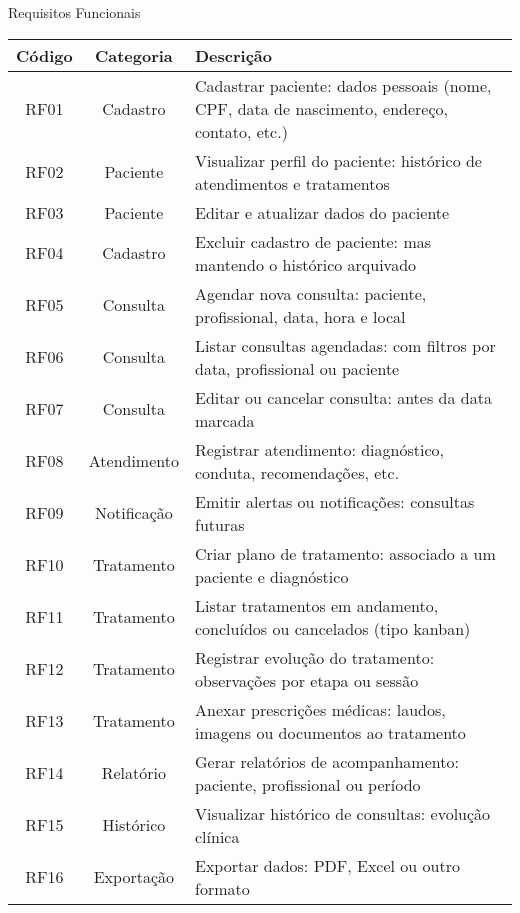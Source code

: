 \begin{quadro}
    \caption{\label{quadro_requisitos_f}Requisitos Funcionais}
    \begin{tabular}{|c|c|p{10cm}|}
        \hline
        \textbf{Código} & \textbf{Categoria} & \textbf{Descrição} \\ \hline
        RF01   & Cadastro     & Cadastrar paciente: dados pessoais (nome, CPF, data de nascimento, endereço, contato, etc.) \\ \hline
        RF02   & Paciente     & Visualizar perfil do paciente: histórico de atendimentos e tratamentos \\ \hline
        RF03   & Paciente     & Editar e atualizar dados do paciente \\ \hline
        RF04   & Cadastro     & Excluir cadastro de paciente: mas mantendo o histórico arquivado \\ \hline
        RF05   & Consulta     & Agendar nova consulta: paciente, profissional, data, hora e local \\ \hline
        RF06   & Consulta     & Listar consultas agendadas: com filtros por data, profissional ou paciente \\ \hline
        RF07   & Consulta     & Editar ou cancelar consulta: antes da data marcada \\ \hline
        RF08   & Atendimento  & Registrar atendimento: diagnóstico, conduta, recomendações, etc. \\ \hline
        RF09   & Notificação  & Emitir alertas ou notificações: consultas futuras \\ \hline
        RF10   & Tratamento   & Criar plano de tratamento: associado a um paciente e diagnóstico \\ \hline
        RF11   & Tratamento   & Listar tratamentos em andamento, concluídos ou cancelados (tipo kanban) \\ \hline
        RF12   & Tratamento   & Registrar evolução do tratamento: observações por etapa ou sessão \\ \hline
        RF13   & Tratamento   & Anexar prescrições médicas: laudos, imagens ou documentos ao tratamento \\ \hline
        RF14   & Relatório    & Gerar relatórios de acompanhamento: paciente, profissional ou período \\ \hline
        RF15   & Histórico    & Visualizar histórico de consultas: evolução clínica \\ \hline
        RF16   & Exportação   & Exportar dados: PDF, Excel ou outro formato \\ \hline

\end{tabular}
\end{quadro}
